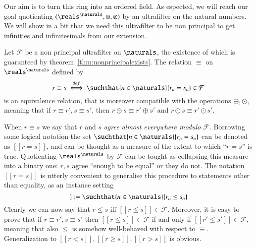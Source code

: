 \documentclass[adraft, copyright,creativecommons,sharealike,noncommercial]{eptcs}
\begin{document}
Our aim is to turn this ring into an ordered field. As espected, we will reach our goal quotienting $(\reals^\naturals, \oplus, \otimes)$ by an ultrafilter on the natural numbers. We will show in a bit that we need this ultrafilter to be non principal to get infinities and infinitesimals from our extension.
\begin{lemma}
	Let $\mathcal{F}$ be a non principal ultrafilter on $\naturals$, the existence of which is guaranteed by theorem~\ref{thm:nonprincipalexists}. The relation $\equiv$ on $\reals^\naturals$ defined by
	\begin{equation*}
		r \equiv s \iffdef \suchthat{n \in \naturals}{r_n = s_n} \in \mathcal{F}
	\end{equation*}
	is an equivalence relation, that is moreover compatible with the operations $\oplus, \odot$, meaning that if $r \equiv r', s \equiv s'$, then $r \oplus s \equiv r' \oplus s'$ and $r \odot s \equiv r' \odot s'$. 
\end{lemma}
When $r \equiv s$ we say that $r$ and $s$ \emph{agree almost everywhere modulo $\mathcal{F}$}. Borrowing some logical notation the set $\suchthat{n \in \naturals}{r_n = s_n}$ can be denoted as $[[r = s]]$, and can be thought as a measure of the extent to which ``$r=s$'' is true. Quotienting $\reals^\naturals$ by $\mathcal{F}$ can be tought as collapsing this measure into a binary one: $r, s$ agree ``enough to be equal'' or they do not. The notation $[[r = s]]$ is utterly convenient to generalise this procedure to statements other than equality, as an instance setting
\begin{equation*}
	[[r \leq s]] := \suchthat{n \in \naturals}{r_n \leq s_n}
\end{equation*}
Clearly we can now say that $r \leq s$ iff $[[r \leq s]] \in \mathcal{F}$. Moreover, it is easy to prove that if $r \equiv r', s \equiv s'$ then $[[r \leq s]] \in \mathcal{F}$ if and only if $[[r' \leq s']] \in \mathcal{F}$, meaning that also $\leq$ is somehow well-behaved with respect to $\equiv$. Generalization to $[[r < s]], [[r \geq s]], [[r > s]]$ is obvious. 
\end{document}
